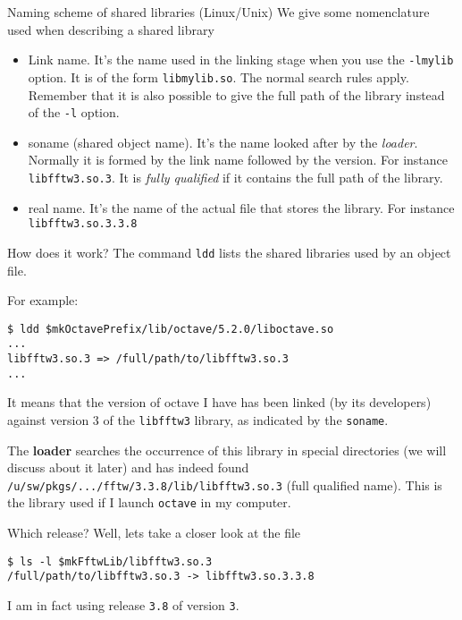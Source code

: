 \documentclass[10pt]{beamer}
\begin{document}
\begin{frame}{Naming scheme of shared libraries (Linux/Unix)}
We give some nomenclature used when describing a shared library

\begin{itemize}
\item Link name. It's the name used in the linking stage when
you use the \texttt{-lmylib} option.  It is of the
form \texttt{libmylib.so}. The normal search rules
apply. Remember that it is also possible to give the full path of
the library instead of the \texttt{-l} option.
\item soname (shared object name).  It's the name looked after
by the \emph{loader}.  Normally it is formed by the link name
followed by the version.  For instance
\texttt{libfftw3.so.3}. It is \emph{fully
qualified} if it contains the full path of the library.
\item real name. It's the name of the actual file that stores the library. 
For instance \texttt{libfftw3.so.3.3.8}
\end{itemize}
\end{frame}


\begin{frame}[fragile]{How does it work?}  The command
\texttt{ldd} lists the shared libraries used by an object file.

For example:
\begin{verbatim}
$ ldd $mkOctavePrefix/lib/octave/5.2.0/liboctave.so
...
libfftw3.so.3 => /full/path/to/libfftw3.so.3
...
\end{verbatim}
It means that the version of octave I have has been linked (by its
developers) against version $3$ of the \texttt{libfftw3} library, 
as indicated by the \texttt{soname}.

The \textbf{loader} searches the occurrence of this library in special
directories (we will discuss about it later) and has indeed found
\texttt{/u/sw/pkgs/.../fftw/3.3.8/lib/libfftw3.so.3} (full qualified name). This is the library used if I launch \texttt{octave} in my computer. \smallskip

Which release? Well, lets take a closer look at the file
\begin{verbatim}
$ ls -l $mkFftwLib/libfftw3.so.3
/full/path/to/libfftw3.so.3 -> libfftw3.so.3.3.8
\end{verbatim}
I am in fact using release \texttt{3.8} of version \texttt{3}.
\end{frame}
\end{document}
